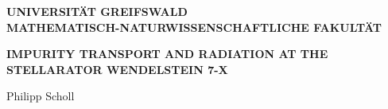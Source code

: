 \documentclass[12pt]{report}
\begin{document}
\begin{titlepage}
    \centering%

    \MakeUppercase{%
        \textbf{%
            Universität Greifswald\\[.3cm]%
        }%
    }%
    \MakeUppercase{%
        \textbf{%
            Mathematisch-Naturwissenschaftliche Fakultät\\%
        }%
    }%



    \vfill%
    \MakeUppercase{%
        \Large%
        \textbf{%
            Impurity Transport and Radiation at the Stellarator Wendelstein 7-X%
        }%
    }%
    \vspace*{3cm}%


    \vfill%
    {\Large%
        Philipp Scholl%
    }%

\end{titlepage}
\end{document}
